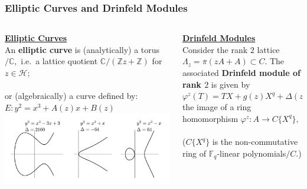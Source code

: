 \documentclass[handout]{beamer}
\numberwithin{equation}{section}
\numberwithin{case}{theorem}
\newcommand{\cH}{\mathcal{H}}		%
\newcommand{\bbC}{\mathbb{C}}		%
\newcommand{\bbF}{\mathbb{F}}		%
\newcommand{\bbZ}{\mathbb{Z}}		%
\newcommand{\<}{\left\langle}
\renewcommand{\>}{\right\rangle}
\begin{document}
	\begin{frame}
		\frametitle{Elliptic Curves and Drinfeld Modules}
		
		\begin{columns} 
			\begin{column}{.5\textwidth}
				\underline{\textbf{Elliptic Curves}}\\
				An \textbf{elliptic curve} is (analytically) a torus$/\bbC,$ \pause 
				i.e.\ a lattice quotient $\bbC/(\bbZ z+\bbZ)$ for $z\in \cH;$\\ \pause $~$\\
				or (algebraically) a curve defined by: 
				$E: y^2=x^3+A(z)x+B(z)$\pause\\
				\includegraphics[scale=0.4]{Silverman_Fig31.png}\\
				\cite[Figure $3.1$]{Silverman-arithmetic-elliptic-curves}
			\end{column}\pause
			\begin{column}{.5\textwidth}
				\underline{\textbf{Drinfeld Modules}}\\
				
				Consider the rank $2$ lattice $\Lambda_z=\overline{\pi}(zA+A)\subset C.$\pause
				The associated \textbf{Drinfeld module of rank $2$} is given by \[\varphi^z(T)=TX+g(z)X^q+\Delta(z)X^{q^2},\]\pause
				the image of a ring homomorphism $\varphi^z: A\to C\{X^q\},$ \\$~$\\
				($C\{X^q\}$ is the non-commutative ring of $\bbF_q$-linear polynomials$/C.$) 
			\end{column}%
		\end{columns}
	\end{frame}
	
\end{document}
